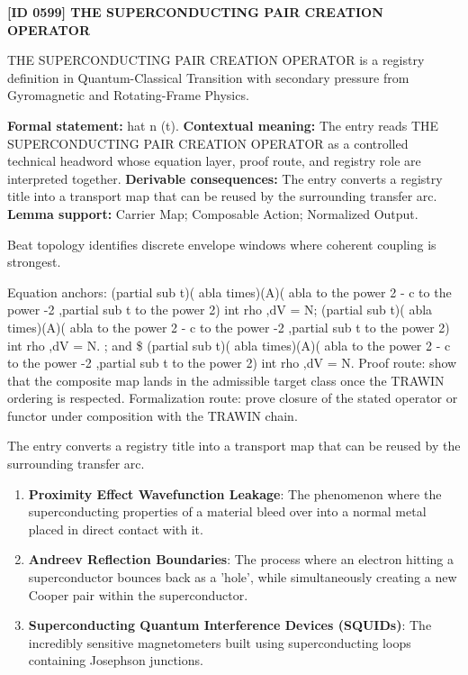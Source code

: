 \clearpage
\noindent\textbf{[ID 0599] THE SUPERCONDUCTING PAIR CREATION OPERATOR}\par
\vspace{0.35em}
\begingroup\small
{}
THE SUPERCONDUCTING PAIR CREATION OPERATOR is a registry definition in Quantum-Classical Transition with secondary pressure from Gyromagnetic and Rotating-Frame Physics.

\begingroup\footnotesize\setlength{\emergencystretch}{3em}\sloppy
\textbf{Formal statement:} hat n (t). \textbf{Contextual meaning:} The entry reads THE SUPERCONDUCTING PAIR CREATION OPERATOR as a controlled technical headword whose equation layer, proof route, and registry role are interpreted together. \textbf{Derivable consequences:} The entry converts a registry title into a transport map that can be reused by the surrounding transfer arc. \textbf{Lemma support:} Carrier Map; Composable Action; Normalized Output.\par
\endgroup

Beat topology identifies discrete envelope windows where coherent coupling is strongest.

Equation anchors: (partial sub t)( abla times)(A)( abla to the power 2 - c to the power -2 ,partial sub t to the power 2) int rho ,dV = N; (partial sub t)( abla times)(A)( abla to the power 2 - c to the power -2 ,partial sub t to the power 2) int rho ,dV = N. ; and \$ (partial sub t)( abla times)(A)( abla to the power 2 - c to the power -2 ,partial sub t to the power 2) int rho ,dV = N. Proof route: show that the composite map lands in the admissible target class once the TRAWIN ordering is respected. Formalization route: prove closure of the stated operator or functor under composition with the TRAWIN chain.

The entry converts a registry title into a transport map that can be reused by the surrounding transfer arc.
\endgroup

\begin{enumerate}[leftmargin=1.6em,itemsep=6pt,topsep=4pt]
\item \textbf{Proximity Effect Wavefunction Leakage}: The phenomenon where the superconducting properties of a material bleed over into a normal metal placed in direct contact with it.
\item \textbf{Andreev Reflection Boundaries}: The process where an electron hitting a superconductor bounces back as a 'hole', while simultaneously creating a new Cooper pair within the superconductor.
\item \textbf{Superconducting Quantum Interference Devices (SQUIDs)}: The incredibly sensitive magnetometers built using superconducting loops containing Josephson junctions.
\end{enumerate}

